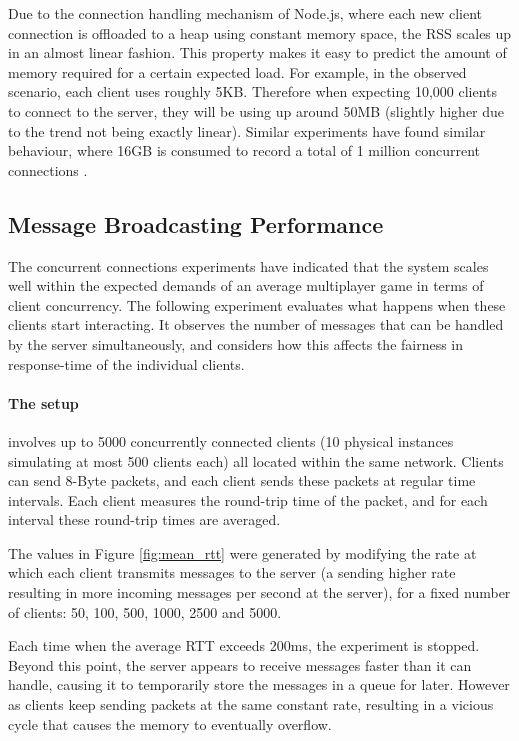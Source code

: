 \documentclass[bsc, 12pt, twoside, singlespacing, parskip, abbrevs, notimes, normalheadings, logo]{styles/infthesis}
\begin{document}
Due to the connection handling mechanism of Node.js, where each new client connection is offloaded to a heap using constant memory space, the RSS scales up in an almost linear fashion. This property makes it easy to predict the amount of memory required for a certain expected load. For example, in the observed scenario, each client uses roughly 5KB. Therefore when expecting 10,000 clients to connect to the server, they will be using up around 50MB (slightly higher due to the trend not being exactly linear). Similar experiments have found similar behaviour, where 16GB is consumed to record a total of 1 million concurrent connections \cite{modejs_1m_connections}.


\subsection{Message Broadcasting Performance}
The concurrent connections experiments have indicated that the system scales well within the expected demands of an average multiplayer game in terms of client concurrency. The following experiment evaluates what happens when these clients start interacting. It observes the number of messages that can be handled by the server simultaneously, and considers how this affects the fairness in response-time of the individual clients.

\paragraph*{The setup}involves up to 5000 concurrently connected clients (10 physical instances simulating at most 500 clients each) all located within the same network. Clients can send 8-Byte packets, and each client sends these packets at regular time intervals. Each client measures the round-trip time of the packet, and for each interval these round-trip times are averaged.

The values in Figure \ref{fig:mean_rtt} were generated by modifying the rate at which each client transmits messages to the server (a sending higher rate resulting in more incoming messages per second at the server), for a fixed number of clients: 50, 100, 500, 1000, 2500 and 5000.

Each time when the average RTT exceeds 200ms, the experiment is stopped. Beyond this point, the server appears to receive messages faster than it can handle, causing it to temporarily store the messages in a queue for later. However as clients keep sending packets at the same constant rate, resulting in a vicious cycle that causes the memory to eventually overflow.
\end{document}
